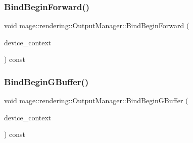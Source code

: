 \hypertarget{classmage_1_1rendering_1_1_output_manager_a678b86feab6fffb88752254a799d456d}{}\label{classmage_1_1rendering_1_1_output_manager_a678b86feab6fffb88752254a799d456d} 
\subsubsection{\texorpdfstring{Bind\+Begin\+Forward()}{BindBeginForward()}}
{\footnotesize\ttfamily void mage\+::rendering\+::\+Output\+Manager\+::\+Bind\+Begin\+Forward (\begin{DoxyParamCaption}\item[{I\+D3\+D11\+Device\+Context \&}]{device\+\_\+context }\end{DoxyParamCaption}) const\hspace{0.3cm}{\ttfamily [noexcept]}}

\hypertarget{classmage_1_1rendering_1_1_output_manager_a93139563e5f5b58ccba4688c3b793e32}{}\label{classmage_1_1rendering_1_1_output_manager_a93139563e5f5b58ccba4688c3b793e32} 
\subsubsection{\texorpdfstring{Bind\+Begin\+G\+Buffer()}{BindBeginGBuffer()}}
{\footnotesize\ttfamily void mage\+::rendering\+::\+Output\+Manager\+::\+Bind\+Begin\+G\+Buffer (\begin{DoxyParamCaption}\item[{I\+D3\+D11\+Device\+Context \&}]{device\+\_\+context }\end{DoxyParamCaption}) const\hspace{0.3cm}{\ttfamily [noexcept]}}

\hypertarget{classmage_1_1rendering_1_1_output_manager_a6c22d77a812e3eacf32cfdb6d6a4d5f4}{}\label{classmage_1_1rendering_1_1_output_manager_a6c22d77a812e3eacf32cfdb6d6a4d5f4} 
